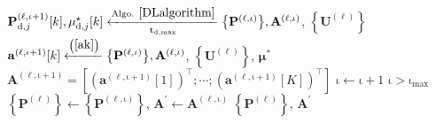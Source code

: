 \documentclass[9pt,journal]{IEEEtran}
\newcommand{\paren}[1]{\left({#1}\right)}
\newcommand{\bracket}[1]{{\left [{#1}\right ]}}
\newcommand{\braces}[1]{{\left\{ {#1}\right\}}}
\newcommand{\B}{\textrm{B}}
\theoremstyle{definition}
\begin{document}
\begin{algorithm}[ht!]
\begin{algorithmic}[1]
		\State %
		$\mathbf{P}^{\paren{\mathrm{\ell,\iota+1}}}_{\textrm{d},j}\bracket{k},\mu^\star_{\textrm{d},j}\bracket{k}\xleftarrow[\mathrm{t}_{\textrm{d,max}}]{\textrm{Algo. }\ref{DLalgorithm}}\braces{\mathbf{P}^{\paren{\mathrm{\ell,\iota}}}},\mathbf{A}^{\paren{\mathrm{\ell,\iota}}}$, $\braces{\mathbf{U}^{\paren{\mathrm{\ell}}}}$
		\EndFor
		\State %
		$\mathbf{a}^{\paren{\mathrm{\ell,\iota+1}}}\bracket{k}\xleftarrow{\paren{\mathrm{\ref{ak}}}}\braces{\mathbf{P}^{\paren{\mathrm{\ell,\iota}}}},\mathbf{A}^{\paren{\mathrm{\ell,\iota}}}$, $\braces{\mathbf{U}^{\paren{\mathrm{\ell}}}}$, $\boldsymbol{\mu}^\ast$
		\EndFor
		\State $\mathbf{A}^{\paren{\mathrm{\ell,\iota+1}}}=\bracket{\paren{\mathbf{a}^{\paren{\mathrm{\ell,\iota+1}}}\bracket{1}}^\top;\cdots;\paren{\mathbf{a}^{\paren{\mathrm{\ell,\iota+1}}}\bracket{\mathrm{\mathit{K}}}}^\top}$
		\State	$\mathrm{\iota}\leftarrow \mathrm{\iota}+1$
		\Until $\mathrm{\iota}>\mathrm{\iota}_{\textrm{max}}$
		\State $\braces{\mathbf{P}^{\paren{\ell}}}\leftarrow\braces{\mathbf{P}^{\paren{\mathrm{\ell,\iota}}}}$,  $\mathbf{A}^{\prime}\leftarrow\mathbf{A}^{\paren{\mathrm{\ell,\iota}}}$
		\State \Return $\braces{\mathbf{P}^{\paren{\ell}}}$, $\mathbf{A}^{\prime}$
	\end{algorithmic}
\end{algorithm}
\end{document}
